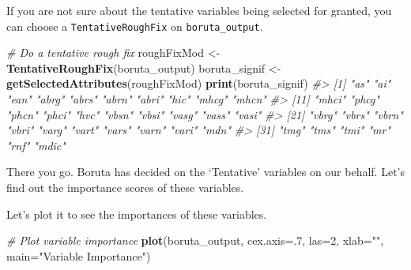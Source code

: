 \documentclass[]{book}
\newenvironment{Shaded}{\begin{snugshade}}{\end{snugshade}}
\newcommand{\CommentTok}[1]{\textcolor[rgb]{0.56,0.35,0.01}{\textit{#1}}}
\newcommand{\DataTypeTok}[1]{\textcolor[rgb]{0.13,0.29,0.53}{#1}}
\newcommand{\DecValTok}[1]{\textcolor[rgb]{0.00,0.00,0.81}{#1}}
\newcommand{\KeywordTok}[1]{\textcolor[rgb]{0.13,0.29,0.53}{\textbf{#1}}}
\newcommand{\NormalTok}[1]{#1}
\newcommand{\OperatorTok}[1]{\textcolor[rgb]{0.81,0.36,0.00}{\textbf{#1}}}
\newcommand{\StringTok}[1]{\textcolor[rgb]{0.31,0.60,0.02}{#1}}
\begin{document}
If you are not sure about the tentative variables being selected for granted, you can choose a \texttt{TentativeRoughFix} on \texttt{boruta\_output}.

\begin{Shaded}
\begin{Highlighting}[]
\CommentTok{# Do a tentative rough fix}
\NormalTok{roughFixMod <-}\StringTok{ }\KeywordTok{TentativeRoughFix}\NormalTok{(boruta_output)}
\NormalTok{boruta_signif <-}\StringTok{ }\KeywordTok{getSelectedAttributes}\NormalTok{(roughFixMod)}
\KeywordTok{print}\NormalTok{(boruta_signif)}
\CommentTok{#>  [1] "as"   "ai"   "ean"  "abrg" "abrs" "abrn" "abri" "hic"  "mhcg" "mhcn"}
\CommentTok{#> [11] "mhci" "phcg" "phcn" "phci" "hvc"  "vbsn" "vbsi" "vasg" "vass" "vasi"}
\CommentTok{#> [21] "vbrg" "vbrs" "vbrn" "vbri" "varg" "vart" "vars" "varn" "vari" "mdn" }
\CommentTok{#> [31] "tmg"  "tms"  "tmi"  "mr"   "rnf"  "mdic"}
\end{Highlighting}
\end{Shaded}

There you go. Boruta has decided on the `Tentative' variables on our behalf. Let's find out the importance scores of these variables.

\begin{Shaded}
\end{Shaded}

Let's plot it to see the importances of these variables.

\begin{Shaded}
\begin{Highlighting}[]
\CommentTok{# Plot variable importance}
\KeywordTok{plot}\NormalTok{(boruta_output, }\DataTypeTok{cex.axis=}\NormalTok{.}\DecValTok{7}\NormalTok{, }\DataTypeTok{las=}\DecValTok{2}\NormalTok{, }\DataTypeTok{xlab=}\StringTok{""}\NormalTok{, }\DataTypeTok{main=}\StringTok{"Variable Importance"}\NormalTok{)  }
\end{Highlighting}
\end{Shaded}
\end{document}
